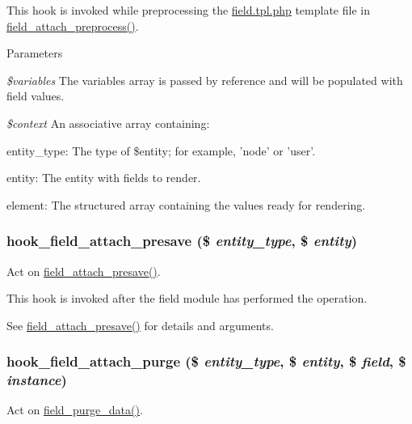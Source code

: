 This hook is invoked while preprocessing the \hyperlink{field_8tpl_8php}{field.tpl.php} template file in \hyperlink{group__field__attach_ga46c512cf3ddf3937a78f9c7a0da4dce6}{field\_\-attach\_\-preprocess()}.


\begin{DoxyParams}{Parameters}
\item[{\em \$variables}]The variables array is passed by reference and will be populated with field values. \item[{\em \$context}]An associative array containing:
\begin{DoxyItemize}
\item entity\_\-type: The type of \$entity; for example, 'node' or 'user'.
\item entity: The entity with fields to render.
\item element: The structured array containing the values ready for rendering. 
\end{DoxyItemize}\end{DoxyParams}
\hypertarget{group__field__attach_gab245c28e50df239cde3a566806ee74db}{
\subsubsection[{hook\_\-field\_\-attach\_\-presave}]{\setlength{\rightskip}{0pt plus 5cm}hook\_\-field\_\-attach\_\-presave (\$ {\em entity\_\-type}, \/  \$ {\em entity})}}
\label{group__field__attach_gab245c28e50df239cde3a566806ee74db}
Act on \hyperlink{group__field__attach_ga8f3ecf532dc49f8aed138695489fc81d}{field\_\-attach\_\-presave()}.

This hook is invoked after the field module has performed the operation.

See \hyperlink{group__field__attach_ga8f3ecf532dc49f8aed138695489fc81d}{field\_\-attach\_\-presave()} for details and arguments. \hypertarget{group__field__attach_ga096a9ba58b47bf4c2aa7e0f80e136ced}{
\subsubsection[{hook\_\-field\_\-attach\_\-purge}]{\setlength{\rightskip}{0pt plus 5cm}hook\_\-field\_\-attach\_\-purge (\$ {\em entity\_\-type}, \/  \$ {\em entity}, \/  \$ {\em field}, \/  \$ {\em instance})}}
\label{group__field__attach_ga096a9ba58b47bf4c2aa7e0f80e136ced}
Act on \hyperlink{group__field__purge_ga93ec2f273b56141a5079bfaf25d6b80e}{field\_\-purge\_\-data()}.

